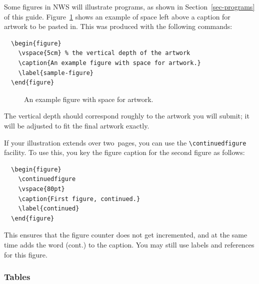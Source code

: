 \documentclass{article}
\begin{document}
Some figures in NWS will illustrate programs, as shown in
Section~\ref{sec-programs} of this guide. Figure~\ref{sample-figure}
shows an example of space left above a caption for artwork to be pasted in.
This was produced with the following commands:
%
\begin{verbatim}
  \begin{figure}
    \vspace{5cm} % the vertical depth of the artwork
    \caption{An example figure with space for artwork.}
    \label{sample-figure}
  \end{figure}
\end{verbatim}
%
\begin{figure}
  \vspace{5cm} %
  \caption{An example figure with space for artwork.}
  \label{sample-figure}
\end{figure}
%
The vertical depth should correspond roughly to the artwork you will submit;
it will be adjusted to fit the final artwork exactly.

If your illustration extends over two~pages, you can use the
\verb"\continuedfigure" facility. To use this, you key the figure
caption for the second figure as follows:
%
\begin{verbatim}
  \begin{figure}
    \continuedfigure
    \vspace{80pt}
    \caption{First figure, continued.}
    \label{continued}
  \end{figure}
\end{verbatim}
%
This ensures that the figure counter does not get incremented, and at the
same time adds the word (cont.) to the caption. You may still use labels
and references for this figure.

\subsubsection{Tables}
\end{document}
